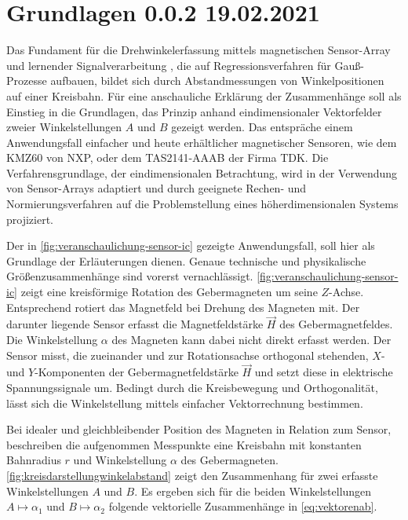 %

\chapter{Grundlagen 0.0.2 19.02.2021}\label{ch:grundlagen}

Das Fundament für die Drehwinkelerfassung mittels magnetischen Sensor-Array und lernender Signalverarbeitung 
\cite{Schuethe2019}\cite{Schuethe2020a}\cite{Schuethe2020}, die auf Regressionsverfahren für Gauß-Prozesse 
\cite{Rasmussen2006} aufbauen, bildet sich durch Abstandmessungen von Winkelpositionen auf einer Kreisbahn. Für eine
anschauliche Erklärung der Zusammenhänge soll als Einstieg in die Grundlagen, das Prinzip anhand eindimensionaler 
Vektorfelder zweier Winkelstellungen $A$ und $B$ gezeigt werden. Das entspräche einem Anwendungsfall einfacher und 
heute erhältlicher magnetischer Sensoren, wie dem KMZ60 \cite{NXPSemiconductors2014} von NXP, oder dem  TAS2141-AAAB 
\cite{TDK2016} der Firma TDK. Die Verfahrensgrundlage, der eindimensionalen Betrachtung, wird in der Verwendung von 
Sensor-Arrays adaptiert und durch geeignete Rechen- und Normierungsverfahren auf die Problemstellung eines 
höherdimensionalen Systems projiziert.


Der in \autoref{fig:veranschaulichung-sensor-ic} gezeigte Anwendungsfall, soll hier als Grundlage der Erläuterungen 
dienen. Genaue technische und physikalische Größenzusammenhänge sind vorerst vernachlässigt. 
\autoref{fig:veranschaulichung-sensor-ic} zeigt eine kreisförmige Rotation des Gebermagneten um seine $Z$-Achse. 
Entsprechend rotiert das Magnetfeld bei Drehung des Magneten mit. Der darunter liegende Sensor erfasst die 
Magnetfeldstärke $\vec{H}$ des Gebermagnetfeldes. Die Winkelstellung $\alpha$ des Magneten kann dabei nicht direkt 
erfasst werden. Der Sensor misst, die zueinander und zur Rotationsachse orthogonal stehenden, $X$- und $Y$-Komponenten 
der Gebermagnetfeldstärke $\vec{H}$ und setzt diese in elektrische Spannungssignale um. Bedingt durch die Kreisbewegung 
und Orthogonalität, lässt sich die Winkelstellung mittels einfacher Vektorrechnung bestimmen. 


\clearpage


Bei idealer und gleichbleibender Position des Magneten in Relation zum Sensor, beschreiben die aufgenommen Messpunkte 
eine Kreisbahn mit konstanten Bahnradius $r$ und Winkelstellung $\alpha$ des Gebermagneten. 
\autoref{fig:kreisdarstellungwinkelabstand} zeigt den Zusammenhang für zwei erfasste Winkelstellungen $A$ und $B$. Es 
ergeben sich für die beiden Winkelstellungen $A\mapsto\alpha_1$ und $B\mapsto\alpha_2$ folgende vektorielle 
Zusammenhänge in \autoref{eq:vektorenab}.


